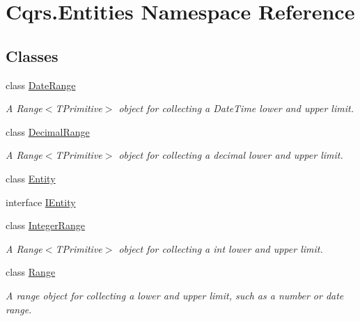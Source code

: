 \hypertarget{namespaceCqrs_1_1Entities}{}\section{Cqrs.\+Entities Namespace Reference}
\label{namespaceCqrs_1_1Entities}
\subsection*{Classes}
\begin{DoxyCompactItemize}
\item 
class \hyperlink{classCqrs_1_1Entities_1_1DateRange}{Date\+Range}
\begin{DoxyCompactList}\small\item\em A Range$<$\+T\+Primitive$>$ object for collecting a Date\+Time lower and upper limit. \end{DoxyCompactList}\item 
class \hyperlink{classCqrs_1_1Entities_1_1DecimalRange}{Decimal\+Range}
\begin{DoxyCompactList}\small\item\em A Range$<$\+T\+Primitive$>$ object for collecting a decimal lower and upper limit. \end{DoxyCompactList}\item 
class \hyperlink{classCqrs_1_1Entities_1_1Entity}{Entity}
\item 
interface \hyperlink{interfaceCqrs_1_1Entities_1_1IEntity}{I\+Entity}
\item 
class \hyperlink{classCqrs_1_1Entities_1_1IntegerRange}{Integer\+Range}
\begin{DoxyCompactList}\small\item\em A Range$<$\+T\+Primitive$>$ object for collecting a int lower and upper limit. \end{DoxyCompactList}\item 
class \hyperlink{classCqrs_1_1Entities_1_1Range}{Range}
\begin{DoxyCompactList}\small\item\em A range object for collecting a lower and upper limit, such as a number or date range. \end{DoxyCompactList}\end{DoxyCompactItemize}
